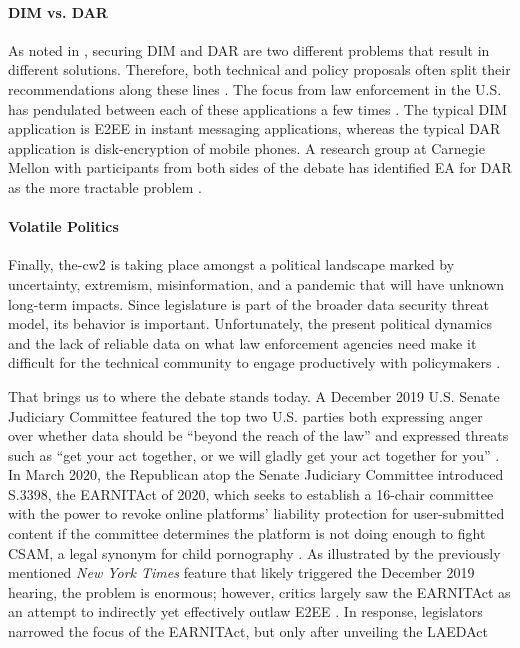 \paragraph*{\ac{DIM} vs. \ac{DAR}} As noted in , securing \acl{DIM} and \acl{DAR} are two
different problems that result in different solutions. Therefore, both technical and policy proposals often split their
recommendations along these lines \cite{group_2019} \cite{owen_law_2018}. The focus from law enforcement in the U.S. has
pendulated between each of these applications a few times \cite{schneier_2019}. The typical \ac{DIM} application is
\ac{E2EE} in instant messaging applications, whereas the typical \ac{DAR} application is \ac{disk-encryption} of mobile
phones. A research group at Carnegie Mellon with participants from both sides of the debate has identified \ac{EA} for
\ac{DAR} as the more tractable problem \cite{group_2019}.

\paragraph*{Volatile Politics} Finally, \ac{the-cw2} is taking place amongst a political landscape marked by
uncertainty, extremism, misinformation, and a pandemic that will have unknown long-term impacts. Since legislature is
part of the broader data security threat model, its behavior is important. Unfortunately, the present political dynamics
and the lack of reliable data on what law enforcement agencies need make it difficult for the technical community to
engage productively with policymakers \cite{granick_2018}.

That brings us to where the debate stands today. A December 2019 U.S. Senate Judiciary Committee featured the top two
U.S. parties both expressing anger over whether data should be ``beyond the reach of the law'' and expressed threats
such as ``get your act together, or we will gladly get your act together for you'' \cite{geller_2019}. In March 2020,
the Republican atop the Senate Judiciary Committee introduced S.3398, the \ac{EARNITAct} of 2020, which seeks to
establish a 16-chair committee with the power to revoke online platforms' liability protection for user-submitted
content if the committee determines the platform is not doing enough to fight \ac{CSAM}, a legal synonym for child
pornography \cite{graham_s3398_2020}. As illustrated by the previously mentioned \textit{New York Times} feature
\cite{keller_internet_2019} that likely triggered the December 2019 hearing, the problem is enormous; however, critics
largely saw the \ac{EARNITAct} as an attempt to indirectly yet effectively outlaw \ac{E2EE} \cite{newman_2020}
\cite{pfefferkorn_2020}. In response, legislators narrowed the focus of the \ac{EARNITAct}, but only after unveiling the
\ac{LAEDAct}

